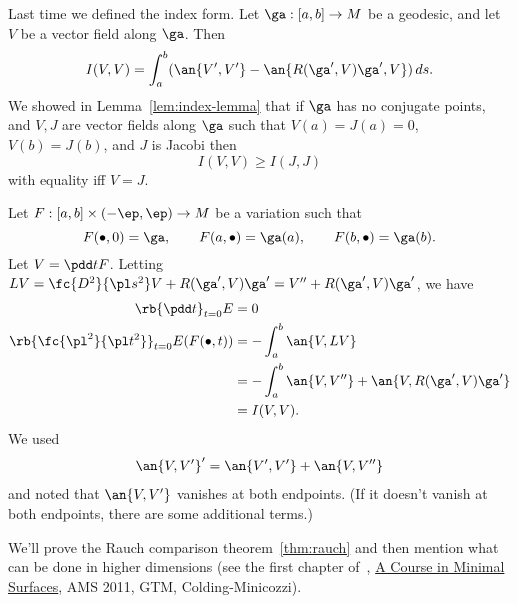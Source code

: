 
Last time we defined the index form. Let $\ga:[a,b]\to M$ be a geodesic, and let $V$ be a vector field along $\ga$. Then
\[
I(V,V)=\int_a^b (\an{V',V'}-\an{R(\ga',V)\ga',V})\,ds.
\]
We showed in Lemma~\ref{lem:index-lemma} that if $\ga$ has no conjugate points, and $V, J$ are vector fields along $\ga$ such that $V(a)=J(a)=0$, $V(b)=J(b)$,  and $J$ is Jacobi then 
\[
I(V,V)\ge I(J,J)
\]
with equality iff $V=J$.

Let $F:[a,b]\times (-\ep,\ep)\to M$ be a variation such that %
\[
F(\bullet, 0)=\ga,\qquad F(a,\bullet)=\ga(a),\qquad F(b,\bullet)=\ga(b).
\]
Let $V=\pdd t F$. Letting $LV=\fc{D^2}{\pl s^2} V+R(\ga',V)\ga' = V''+R(\ga',V)\ga'$, we have
\begin{align*}
\rb{\pdd t}_{t=0} E&=0\\
\rb{\fc{\pl^2}{\pl t^2}}_{t=0} E(F(\bullet,t))&=-\int_a^b \an{V,LV}\\
&=-\int_a^b\an{V,V''} + \an{V,R(\ga',V)\ga'}\\
&=I(V,V).
\end{align*}
We used 
\begin{align*}
\an{V,V'}'=\an{V',V'}+\an{V,V''}
\end{align*}
and noted that $\an{V,V'}$ vanishes at both endpoints. 
(If it doesn't vanish at both endpoints, there are some additional terms.)

We'll prove the Rauch comparison theorem~\ref{thm:rauch} and then mention what can be done in higher dimensions (see the first chapter of~\cite{CM}, \ul{A Course in Minimal Surfaces}, AMS 2011, GTM, Colding-Minicozzi).
